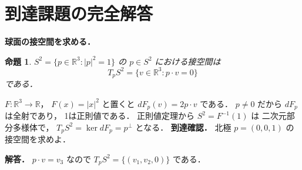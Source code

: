 \documentclass[a5paper,10pt,onecolumn]{jsarticle}
\makeatletter
\theoremstyle{mathnotetheorem}
\newtheorem{proposition}[theorem]{命題}
\renewcommand{\proofname}{証明}
\renewenvironment{proof}[1][\proofname]{%
  \par\pushQED{\qed}\normalfont\topsep4\p@\@plus2\p@\relax
  \trivlist\item[\hskip\labelsep\bfseries #1]\ignorespaces
}{\popQED\endtrivlist\@endpefalse}
\makeatother
\begin{document}
\section{到達課題の完全解答}
\noindent\textbf{球面の接空間を求める．}
\begin{proposition}
$S^2=\{p\in\mathbb R^3:|p|^2=1\}$ の
$p\in S^2$ における接空間は
\[
T_pS^2=\{v\in\mathbb R^3:p\cdot v=0\}
\]
である．
\end{proposition}
\begin{proof}
$F:\mathbb R^3\to\mathbb R$，
$F(x)=|x|^2$ と置くと
$dF_p(v)=2p\cdot v$ である．
$p\ne0$ だから $dF_p$ は全射であり，
1は正則値である．
正則値定理から $S^2=F^{-1}(1)$ は
二次元部分多様体で，
$T_pS^2=\ker dF_p=p^\perp$ となる．
\end{proof}
\noindent\textbf{到達確認．}
北極 $p=(0,0,1)$ の接空間を求めよ．
\par\noindent\textbf{解答．}
$p\cdot v=v_3$ なので
$T_pS^2=\{(v_1,v_2,0)\}$ である．
\end{document}
